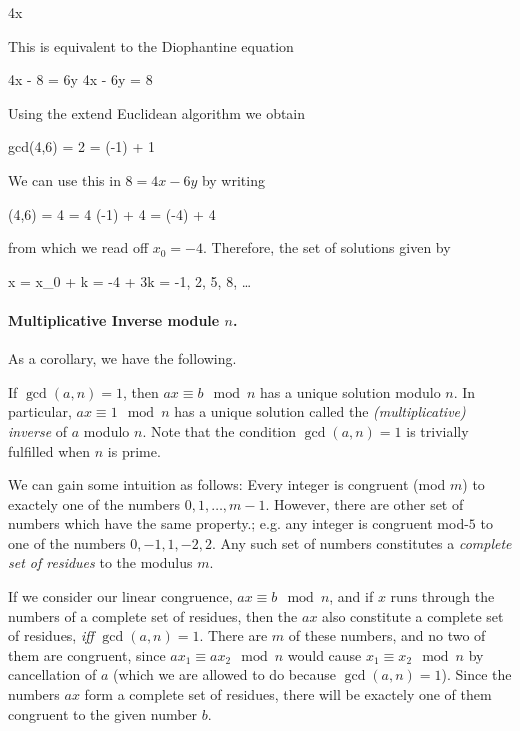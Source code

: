 \bee
4x  
\eee

This is equivalent to the Diophantine equation

\bee
4x - 8 = 6y \rightarrow 4x - 6y = 8
\eee

Using the extend Euclidean algorithm we obtain

\bee
gcd(4,6) = 2 = (-1)  + 1 
\eee

We can use this in $8 = 4x - 6y$ by writing

 \cdot \gcd(4,6) = 4  = 4 \cdot (-1)  + 4   = (-4)  + 4 
\eee

from which we read off $x_0 = -4$. Therefore, the set of solutions given by

\bee
x = x_0 + k  = -4 + 3k = -1, 2, 5, 8, \ldots
\eee

\paragraph{Multiplicative Inverse module $n$.} As a corollary, we have the following.

\begin{theorem}\label{2020-11-25:th2}
    If $\gcd(a,n) = 1$, then $a x \equiv b \mod n$ has a unique solution modulo $n$. In particular, $a x \equiv 1 \mod n$ has a unique solution called the \emph{(multiplicative) inverse} of $a$ modulo $n$. Note that the condition $\gcd(a,n) = 1$ is trivially fulfilled when $n$ is prime.
\end{theorem}

We can gain some intuition as follows: Every integer is congruent (mod $m$) to exactely one of the numbers $0,1,\ldots, m-1$. However, there are other set of numbers which have the same property.; e.g. any integer is congruent mod-$5$ to one of the numbers $0,-1,1,-2,2$. Any such set of numbers constitutes a \emph{complete set of residues} to the modulus $m$.

If we consider our linear congruence, $ax \equiv b \mod n$, and if $x$ runs through the numbers of a complete set of residues, then the $ax$ also constitute a complete set of residues, \emph{iff} $\gcd(a,n) = 1$. There are $m$ of these numbers, and no two of them are congruent, since $a x_1 \equiv a x_2 \mod n$ would cause $x_1 \equiv x_2 \mod n$ by cancellation of $a$ (which we are allowed to do because $\gcd(a,n) = 1$). Since the numbers $ax$ form a complete set of residues, there will be exactely one of them congruent to the given number $b$.

